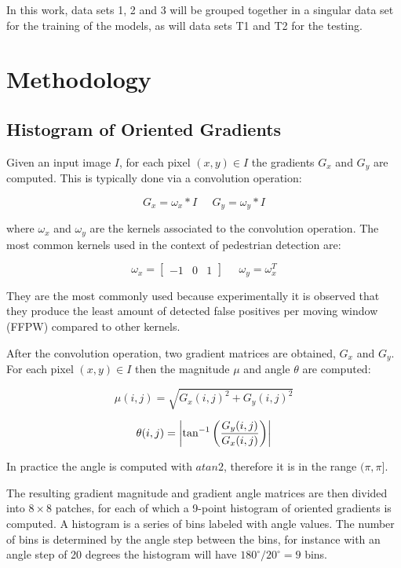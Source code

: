 \documentclass[journal,twocolumn]{IEEEtran}
\begin{document}
In this work, data sets 1, 2 and 3 will be grouped together in a singular data set for the training of the models, as will data sets T1 and T2 for the testing.

\section{Methodology}
\label{sec:meth}

\subsection{Histogram of Oriented Gradients}

Given an input image $I$, for each pixel $(x,y)\in I$ the gradients $G_x$ and $G_y$ are computed. This is typically done via a convolution operation:

\begin{equation*}
G_x=\omega_x* I\;\;\;\;\;G_y=\omega_y* I
\end{equation*}

where $\omega_x$ and $\omega_y$ are the kernels associated to the convolution operation. The most common kernels used in the context of pedestrian detection are:

\begin{equation*}
\omega_x=\begin{bmatrix}
-1 & 0 & 1
\end{bmatrix}\;\;\;\;\;\omega_y=\omega_x^T
\end{equation*}

They are the most commonly used because experimentally it is observed\cite{2} that they produce the least amount of detected false positives per moving window (FFPW) compared to other kernels.

After the convolution operation, two gradient matrices are obtained, $G_x$ and $G_y$. For each pixel $(x,y)\in I$ then the magnitude $\mu$ and angle $\theta$ are computed:

\begin{equation*}
\mu(i,j)=\sqrt{G_x(i,j)^2+G_y(i,j)^2}
\end{equation*}

\begin{equation*}
\theta(i,j)=\abs{\tan^{-1}\left(\frac{G_y(i,j)}{G_x(i,j)}\right)}
\end{equation*}

In practice the angle is computed with $atan2$, therefore it is in the range $(\pi,\pi]$.

The resulting gradient magnitude and gradient angle matrices are then divided into $8\times 8$ patches, for each of which a 9-point histogram of oriented gradients is computed. A
histogram is a series of bins labeled with angle values. The
number of bins is determined by the angle step between
the bins, for instance with an angle step of 20 degrees the
histogram will have $180^\circ/20^\circ = 9$ bins.
\end{document}
